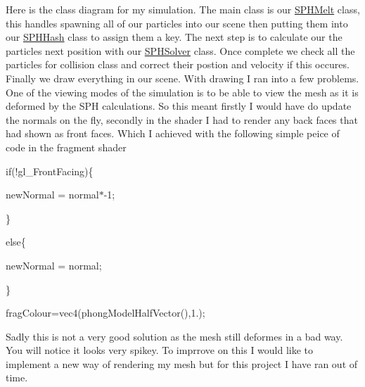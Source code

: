    Here is the class diagram for my simulation. The main class is our \hyperlink{classSPHMelt}{S\-P\-H\-Melt} class, this handles spawning all of our particles into our scene then putting them into our \hyperlink{classSPHHash}{S\-P\-H\-Hash} class to assign them a key. The next step is to calculate our the particles next position with our \hyperlink{classSPHSolver}{S\-P\-H\-Solver} class. Once complete we check all the particles for collision class and correct their postion and velocity if this occures. Finally we draw everything in our scene. With drawing I ran into a few problems. One of the viewing modes of the simulation is to be able to view the mesh as it is deformed by the S\-P\-H calculations. So this meant firstly I would have do update the normals on the fly, secondly in the shader I had to render any back faces that had shown as front faces. Which I achieved with the following simple peice of code in the fragment shader \par
 if(!gl\-\_\-\-Front\-Facing)\{\par
 new\-Normal = normal$\ast$-\/1;\par
 \}\par
 else\{\par
 new\-Normal = normal;\par
 \}\par
 frag\-Colour=vec4(phong\-Model\-Half\-Vector(),1.);\par


Sadly this is not a very good solution as the mesh still deformes in a bad way. You will notice it looks very spikey. To imprrove on this I would like to implement a new way of rendering my mesh but for this project I have ran out of time.\par
 